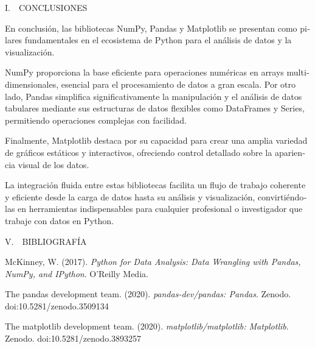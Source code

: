 \documentclass[letterpaper]{article}
\newcommand\textstyleEmphasis[1]{\textit{#1}}
\begin{document}
\begin{multicols}{2}



\bigskip


\bigskip


\bigskip


\bigskip

{
I.\ \ CONCLUSIONES}

{
\foreignlanguage{spanish}{En conclusión, las bibliotecas NumPy, Pandas y Matplotlib se presentan como pilares
fundamentales en el ecosistema de Python para el análisis de datos y la visualización. }}


\bigskip

{
\foreignlanguage{spanish}{NumPy proporciona la base eficiente para operaciones numéricas en arrays multidimensionales,
esencial para el procesamiento de datos a gran escala. Por otro lado, Pandas simplifica significativamente la
manipulación y el análisis de datos tabulares mediante sus estructuras de datos flexibles como DataFrames y Series,
permitiendo operaciones complejas con facilidad. }}


\bigskip

{
\foreignlanguage{spanish}{Finalmente, Matplotlib destaca por su capacidad para crear una amplia variedad de gráficos
estáticos y interactivos, ofreciendo control detallado sobre la apariencia visual de los datos. }}


\bigskip

{
\foreignlanguage{spanish}{La integración fluida entre estas bibliotecas facilita un flujo de trabajo coherente y
eficiente desde la carga de datos hasta su análisis y visualización, convirtiéndolas en herramientas indispensables
para cualquier profesional o investigador que trabaje con datos en Python.}}


\bigskip


\bigskip

{
\foreignlanguage{english}{V.\ \ BIBLIOGRAFÍA}}


\bigskip

{
\foreignlanguage{english}{McKinney, W. (2017). }\textstyleEmphasis{\foreignlanguage{english}{Python for Data Analysis:
Data Wrangling with Pandas, NumPy, and IPython}}\foreignlanguage{english}{. O'Reilly Media.}}


\bigskip

{
\foreignlanguage{english}{The pandas development team. (2020).
}\textstyleEmphasis{\foreignlanguage{english}{pandas-dev/pandas: Pandas}}\foreignlanguage{english}{. Zenodo.
doi:10.5281/zenodo.3509134}}


\bigskip

{
\foreignlanguage{english}{The matplotlib development team. (2020).
}\textstyleEmphasis{\foreignlanguage{english}{matplotlib/matplotlib: Matplotlib}}\foreignlanguage{english}{. Zenodo.
doi:10.5281/zenodo.3893257}}
\end{multicols}
\end{document}
